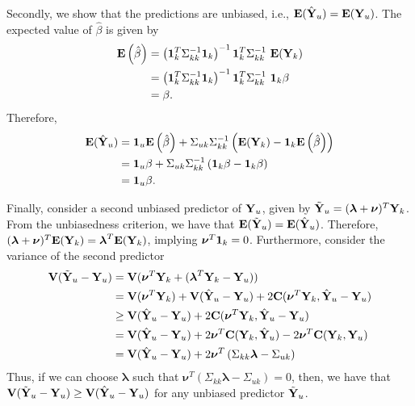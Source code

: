 \documentclass[a4paper,10pt]{article}
\def\bY{{\bf Y}}
\def\bE{{\bf E}}
\def\bV{{\bf V}}
\def\bC{{\bf C}}
\def\b1{{\bf 1}}
\def\blambda{{\boldsymbol \lambda}}
\def\bnu{{\boldsymbol \nu}}
\begin{document}
Secondly, we show that the predictions are unbiased, i.e., $\bE(\hat \bY_u) = \bE(\bY_u)$. The expected value of $\hat \beta$ is given by
\begin{align*}
 \bE \left( \hat \beta \right) &= \left( \b1_k^T \Sigma_{kk}^{-1} \b1_k \right)^{-1} \b1_k^T \Sigma_{kk}^{-1} ~ \bE (\bY_k) \\
  &= \left( \b1_k^T \Sigma_{kk}^{-1} \b1_k \right)^{-1} \b1_k^T \Sigma_{kk}^{-1} ~ \b1_k \beta \\
  &= \beta.
\end{align*}
Therefore,
\begin{align*}
 \bE(\hat \bY_u) &=  \b1_u \bE\left(\hat \beta \right) + \Sigma_{uk} \Sigma_{kk}^{-1}\left( \bE(\bY_k) - \b1_k \bE \left(\hat \beta \right)\right) \\
 &= \b1_u \beta + \Sigma_{uk} \Sigma_{kk}^{-1}\left( \b1_k \beta - \b1_k \beta \right) \\
 &= \b1_u \beta.
\end{align*}

Finally, consider a second unbiased predictor of $\bY_u$, given by $\tilde \bY_u = (\blambda + \bnu)^T \bY_k$. From the unbiasedness criterion, we have that $\bE(\tilde \bY_u) = \bE(\hat \bY_u)$. Therefore, $(\blambda + \bnu)^T \bE(\bY_k) = \blambda^T \bE(\bY_k)$, implying $\bnu^T \b1_k = 0$. Furthermore, consider the variance of the second predictor
\begin{align*}
 \bV(\tilde \bY_u - \bY_u) &= \bV(\bnu^T \bY_k + (\blambda^T \bY_k - \bY_u))\\
 &= \bV(\bnu^T \bY_k) + \bV(\hat \bY_u - \bY_u) + 2\bC(\bnu^T \bY_k, \hat \bY_u - \bY_u) \\
 &\ge \bV(\hat \bY_u - \bY_u) + 2\bC(\bnu^T \bY_k, \hat \bY_u - \bY_u)\\
 &= \bV(\hat \bY_u - \bY_u) + 2\bnu^T \bC(\bY_k, \hat \bY_u) - 2 \bnu^T \bC(\bY_k, \bY_u) \\
 &= \bV(\hat \bY_u - \bY_u) + 2\bnu^T \left(  \Sigma_{kk} \blambda - \Sigma_{uk}\right)
\end{align*}
Thus, if we can choose $\blambda$ such that $\bnu^T \left(  \Sigma_{kk} \blambda - \Sigma_{uk}\right) = 0$, then, we have that $\bV(\tilde \bY_u - \bY_u) \ge \bV(\hat \bY_u - \bY_u)$ for any unbiased predictor $\tilde \bY_u$.
\end{document}
